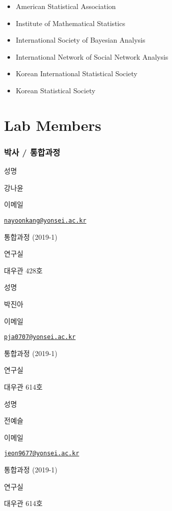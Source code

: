\documentclass[
]{book}
\providecommand{\tightlist}{%
  \setlength{\itemsep}{0pt}\setlength{\parskip}{0pt}}
\begin{document}
\begin{itemize}
\tightlist
\item
  American Statistical Association
\item
  Institute of Mathematical Statistics
\item
  International Society of Bayesian Analysis
\item
  International Network of Social Network Analysis
\item
  Korean International Statistical Society
\item
  Korean Statistical Society
\end{itemize}

\hypertarget{lab-members}{%
\chapter*{Lab Members}\label{lab-members}}

\hypertarget{uxbc15uxc0ac-uxd1b5uxd569uxacfcuxc815}{%
\subsection*{박사 / 통합과정}\label{uxbc15uxc0ac-uxd1b5uxd569uxacfcuxc815}}

성명

강나윤

이메일

\href{mailto:nayoonkang@yonsei.ac.kr}{\nolinkurl{nayoonkang@yonsei.ac.kr}}

통합과정 (2019-1)

연구실

대우관 428호

성명

박진아

이메일

\href{mailto:pja0707@yonsei.ac.kr}{\nolinkurl{pja0707@yonsei.ac.kr}}

통합과정 (2019-1)

연구실

대우관 614호

성명

전예슬

이메일

\href{mailto:jeon9677@yonsei.ac.kr}{\nolinkurl{jeon9677@yonsei.ac.kr}}

통합과정 (2019-1)

연구실

대우관 614호
\end{document}
